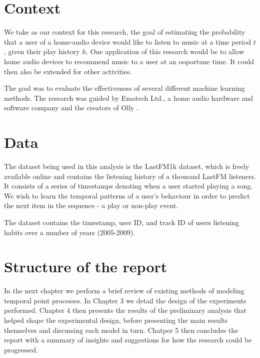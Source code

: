 \section{Context}

We take as our context for this research, the goal of estimating the probability that a user of a home-audio device would like to listen to music at a time period $t$, given their play history $h$. One application of this research would be to allow home audio devices to recommend music to a user at an ooportune time. It could then also be extended for other activities.

The goal was to evaluate the effectiveness of several different machine learning methods. The research was guided by Emotech Ltd., a home audio hardware and software company and the creators of Olly \parencite{Olly}.

\section{Data}

The dataset being used in this analysis is the LastFM1k dataset, which is freely available online and contains the listening history of a thousand LastFM listeners. It consists of a series of timestamps denoting when a user started playing a song. We wish to learn the temporal patterns of a user's behaviour in order to predict the next item in the sequence - a play or non-play event. 

The dataset contains the timestamp, user ID, and track ID of users listening habits over a number of years (2005-2009).

\section{Structure of the report}

In the next chapter we perform a brief review of existing methods of modeling temporal point processes. In Chapter 3 we detail the design of the experiments performed. Chapter 4 then presents the results of the preliminary analysis that helped shape the experimental design, before presenting the main results themselves and discussing each model in turn. Chatper 5 then concludes the report with a summary of insights and suggestions for how the research could be progressed.